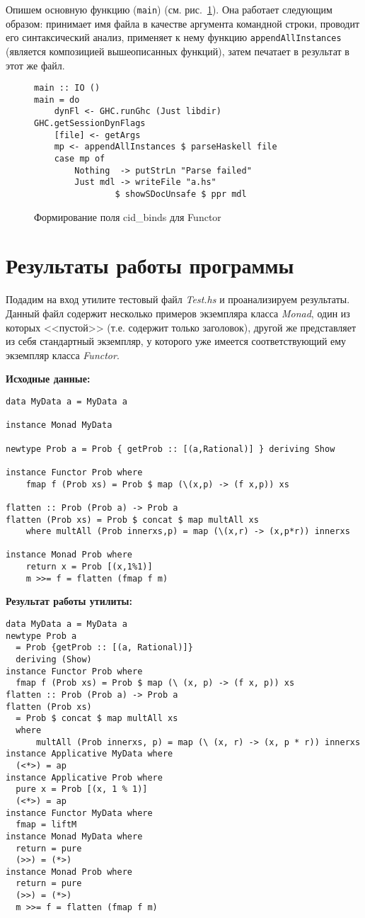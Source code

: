 Опишем основную функцию (\lstinline{main}) (см. рис.~\ref{main}). Она работает следующим образом: принимает имя файла в качестве аргумента командной строки, проводит его синтаксический анализ, применяет к нему функцию \lstinline{appendAllInstances} (является композицией вышеописанных функций), затем печатает в результат в этот же файл.

\begin{figure}[h]
\hrulefill
\begin{lstlisting}
main :: IO ()
main = do
    dynFl <- GHC.runGhc (Just libdir) GHC.getSessionDynFlags
    [file] <- getArgs
    mp <- appendAllInstances $ parseHaskell file
    case mp of
        Nothing  -> putStrLn "Parse failed"
        Just mdl -> writeFile "a.hs" 
                $ showSDocUnsafe $ ppr mdl
\end{lstlisting}
\hrulefill
\caption{Формирование поля cid\_binds для Functor}\label{main}
\end{figure}

\newpage
\section{Результаты работы программы}
Подадим на вход утилите тестовый файл \textit{Test.hs} и проанализируем результаты. Данный файл содержит несколько примеров экземпляра класса \textit{Monad}, один из которых <<пустой>> (т.е. содержит только заголовок), другой же представляет из себя стандартный экземпляр, у которого уже имеется соответствующий ему экземпляр класса \textit{Functor}.



\textbf{Исходные данные:}
\begin{lstlisting}
data MyData a = MyData a

instance Monad MyData

newtype Prob a = Prob { getProb :: [(a,Rational)] } deriving Show

instance Functor Prob where  
    fmap f (Prob xs) = Prob $ map (\(x,p) -> (f x,p)) xs 
 
flatten :: Prob (Prob a) -> Prob a  
flatten (Prob xs) = Prob $ concat $ map multAll xs  
    where multAll (Prob innerxs,p) = map (\(x,r) -> (x,p*r)) innerxs

instance Monad Prob where  
    return x = Prob [(x,1%1)]  
    m >>= f = flatten (fmap f m)
\end{lstlisting}
\textbf{Результат работы утилиты:}
\begin{lstlisting}
data MyData a = MyData a
newtype Prob a
  = Prob {getProb :: [(a, Rational)]}
  deriving (Show)
instance Functor Prob where
  fmap f (Prob xs) = Prob $ map (\ (x, p) -> (f x, p)) xs
flatten :: Prob (Prob a) -> Prob a
flatten (Prob xs)
  = Prob $ concat $ map multAll xs
  where
      multAll (Prob innerxs, p) = map (\ (x, r) -> (x, p * r)) innerxs
instance Applicative MyData where
  (<*>) = ap
instance Applicative Prob where
  pure x = Prob [(x, 1 % 1)]
  (<*>) = ap
instance Functor MyData where
  fmap = liftM
instance Monad MyData where
  return = pure
  (>>) = (*>)
instance Monad Prob where
  return = pure
  (>>) = (*>)
  m >>= f = flatten (fmap f m)
\end{lstlisting}

